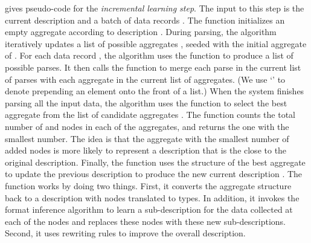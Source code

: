  gives pseudo-code for the {\em incremental
  learning step}.  The input to this step is the current description
 and a batch of data records .  The 
function initializes an empty aggregate according to description
.  During parsing, the algorithm iteratively updates a list of
possible aggregates , seeded with the initial aggregate of
.  For each data record , the algorithm uses the
 function to produce a list  of possible parses.  It
then calls the  function to merge each parse  in
the current list of parses with each aggregate  in the current
list of aggregates.  (We use `\cd{::}' to denote prepending an element
onto the front of a list.)  When the system finishes parsing all the
input data, the algorithm uses the  function to
select the best aggregate from the list of candidate aggregates
.  The  function counts the total number of
 and  nodes in each of the aggregates, and returns
the one with the smallest number.
The idea is that the aggregate with the smallest number of added nodes is 
more likely to represent a description
that is the close to the original description. 
Finally, the  function uses the structure of the best
aggregate to update the previous description  to produce the new
current description .  The  function works by
doing two things.
First, it converts the aggregate structure back to a \pads{} description
with  nodes translated to  types. In addition,
it invokes the \learnpads{} format inference
algorithm to learn a sub-description for the data collected 
at each of the  nodes
and replaces these  nodes with these new sub-descriptions. 
Second, it uses rewriting
rules to improve the overall description.

